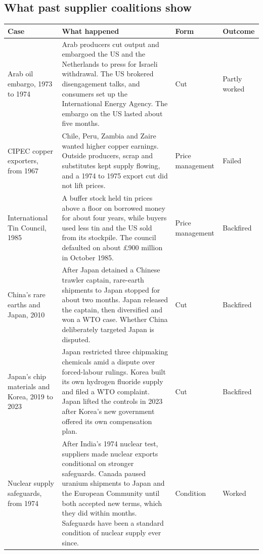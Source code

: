 \documentclass[11pt]{article}
\begin{document}
\subsection{What past supplier coalitions show}

\begin{table}[htbp]
\centering\small
\begin{tabularx}{\linewidth}{@{}>{\raggedright\arraybackslash}p{3.0cm} X >{\raggedright\arraybackslash}p{1.6cm} >{\raggedright\arraybackslash}p{1.6cm}@{}}
\toprule
\textbf{Case} & \textbf{What happened} & \textbf{Form} & \textbf{Outcome}\\
\midrule
Arab oil embargo, 1973 to 1974 & Arab producers cut output and embargoed the US and the Netherlands to press for Israeli withdrawal. The US brokered disengagement talks, and consumers set up the International Energy Agency. The embargo on the US lasted about five months. & Cut & Partly worked\\
CIPEC copper exporters, from 1967 & Chile, Peru, Zambia and Zaire wanted higher copper earnings. Outside producers, scrap and substitutes kept supply flowing, and a 1974 to 1975 export cut did not lift prices. & Price management & Failed\\
International Tin Council, 1985 & A buffer stock held tin prices above a floor on borrowed money for about four years, while buyers used less tin and the US sold from its stockpile. The council defaulted on about \pounds900 million in October 1985. & Price management & Backfired\\
China's rare earths and Japan, 2010 & After Japan detained a Chinese trawler captain, rare-earth shipments to Japan stopped for about two months. Japan released the captain, then diversified and won a WTO case. Whether China deliberately targeted Japan is disputed. & Cut & Backfired\\
Japan's chip materials and Korea, 2019 to 2023 & Japan restricted three chipmaking chemicals amid a dispute over forced-labour rulings. Korea built its own hydrogen fluoride supply and filed a WTO complaint. Japan lifted the controls in 2023 after Korea's new government offered its own compensation plan. & Cut & Backfired\\
Nuclear supply safeguards, from 1974 & After India's 1974 nuclear test, suppliers made nuclear exports conditional on stronger safeguards. Canada paused uranium shipments to Japan and the European Community until both accepted new terms, which they did within months. Safeguards have been a standard condition of nuclear supply ever since. & Condition & Worked\\

\end{tabularx}
\end{table}
\end{document}
